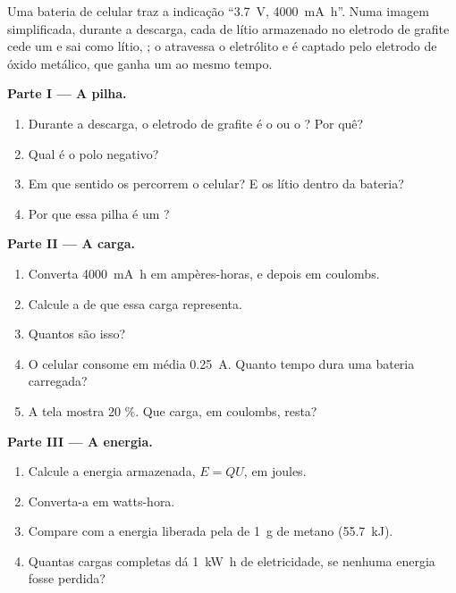 \begin{problem}
\label{pb:g12:cells-and-electrolysis:1}
Uma bateria de celular traz a indicação ``\qty{3.7}{V}, \qty{4000}{mA.h}''.
Numa imagem simplificada, durante a descarga, cada  de lítio
armazenado no eletrodo de grafite cede um  e sai como  lítio,
; o  atravessa o eletrólito e é captado pelo
eletrodo de óxido metálico, que ganha um  ao mesmo tempo.

\medskip
\noindent\textbf{Parte I --- A pilha.}
\begin{enumerate}
  \item Durante a descarga, o eletrodo de grafite é o  ou o
        ? Por quê?
  \item Qual é o polo negativo?
  \item Em que sentido os  percorrem o celular? E os  lítio
        dentro da bateria?
  \item Por que essa pilha é um ?
\end{enumerate}

\medskip
\noindent\textbf{Parte II --- A carga.}
\begin{enumerate}[resume]
  \item Converta \qty{4000}{mA.h} em ampères-horas, e depois em coulombs.
  \item Calcule a  de  que essa carga
        representa.
  \item Quantos  são isso?
  \item O celular consome em média \qty{0.25}{A}. Quanto tempo dura uma
        bateria carregada?
  \item A tela mostra 20 \%. Que carga, em coulombs, resta?
\end{enumerate}

\medskip
\noindent\textbf{Parte III --- A energia.}
\begin{enumerate}[resume]
  \item Calcule a energia armazenada, $E = Q U$, em joules.
  \item Converta-a em watts-hora.
  \item Compare com a energia liberada pela  de \qty{1}{g} de
        metano (\qty{55.7}{kJ}).
  \item Quantas cargas completas dá \qty{1}{kW.h} de eletricidade, se
        nenhuma energia fosse perdida?
\end{enumerate}


\end{problem}
